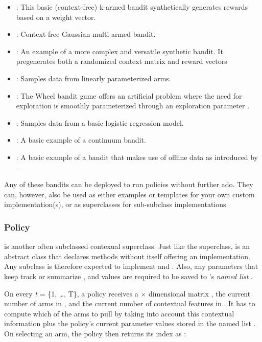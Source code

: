 \documentclass{jss}
\begin{document}
\begin{itemize}
         \item {}: This basic (context-free) k-armed bandit synthetically generates rewards based on a weight vector.
         \item {}: Context-free Gaussian multi-armed bandit.
         \item {}: An example of a more complex and versatile synthetic bandit. It pregenerates both a randomized context matrix and reward vectors
         \item {}: Samples data from linearly parameterized arms.
         \item {}: The Wheel bandit game offers an artificial problem where the need for exploration is smoothly parameterized through an exploration parameter \citep{Riquelme2018}.
         \item {}: Samples data from a basic logistic regression model.
         \item {}: A basic example of a continuum bandit.
         \item {}: A basic example of a bandit that makes use of offline data as introduced by \cite{Li2010}.
\end{itemize}



Any of these bandits can be deployed to run policies without further ado. They can, however, also be used as either examples or templates for your own custom  implementation(s), or as superclasses for sub-subclass implementations.

\subsubsection{Policy}

 is another often subclassed contexual superclass. Just like the  superclass,  is an abstract class that declares methods without itself offering an implementation. Any  subclass is therefore expected to implement  and . Also, any parameters that keep track or summarize ,  and  values are required to be saved to 's \textit{named list} .

On every \emph{t} = \{1, \ldots, T\}, a policy receives a  $\times$  dimensional matrix , the current number of  arms in , and the current number of contextual features in . It has to compute which of the   arms to pull by taking into account this contextual information plus the policy's current parameter values stored in the named list . On selecting an arm, the policy then returns its index as :
\end{document}
